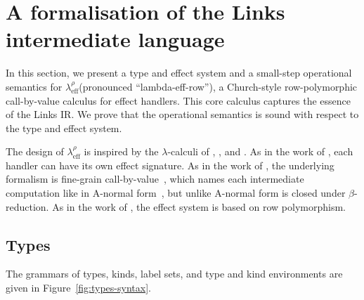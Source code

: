 \documentclass[12pt,mscres,cdtppar,twoside,openright,logo,rightchapter,normalheadings]{infthesis}
\theoremstyle{definition}
\newcommand{\Calc}{\ensuremath{\lambda_{\text{eff}}^\rho}\xspace}
\begin{document}
\section{A formalisation of the Links intermediate language}
\label{sec:lambe-eff-row}

In this section, we present a type and effect system and a small-step
operational semantics for \Calc (pronounced ``lambda-eff-row''), a
Church-style row-polymorphic call-by-value calculus for effect
handlers.
%
This core calculus captures the essence of the Links IR.
%
We prove that the operational semantics is sound with respect to the
type and effect system.


The design of \Calc is inspired by the $\lambda$-calculi of
\citet{Kammar2013}, \citet{Pretnar2015}, and \citet{Lindley2012}.
%
As in the work of \citet{Kammar2013}, each handler can have its own
effect signature. As in the work of \citet{Pretnar2015}, the
underlying formalism is fine-grain call-by-value~\citep{LevyPT03},
which names each intermediate computation like in A-normal
form~\citep{Flanagan1993}, but unlike A-normal form is closed under
$\beta$-reduction. As in the work of \citet{Lindley2012}, the effect
system is based on row polymorphism.

\subsection{Types}
The grammars of types, kinds, label sets, and type and kind
environments are given in Figure~\ref{fig:types-syntax}.
\end{document}
